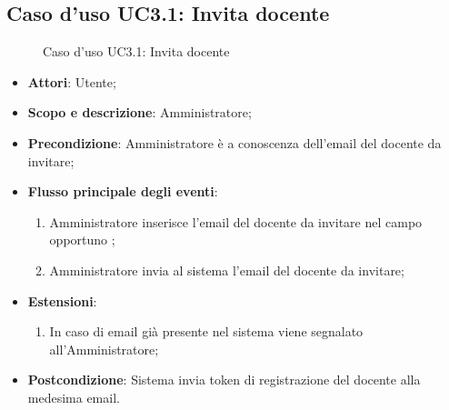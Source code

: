 \documentclass[12pt,a4paper]{article}
\begin{document}
\subsection{Caso d'uso UC3.1: Invita docente}
\begin{figure}[H]
	\centering

	\caption{Caso d'uso UC3.1: Invita docente}\label{fig:UC3.1} 
\end{figure}\begin{itemize}
\item \textbf{Attori}: Utente;
\item \textbf{Scopo e descrizione}: Amministratore; 
\item \textbf{Precondizione}: Amministratore è a conoscenza dell’email del docente da invitare;

\item \textbf{Flusso principale degli eventi}:
\begin{enumerate}
	\item Amministratore inserisce l'email del docente da invitare nel campo opportuno ;
	\item Amministratore invia al sistema l'email del docente da invitare;
	
\end{enumerate}
\item \textbf{Estensioni}:
\begin{enumerate}
	\item In caso di email già presente nel sistema viene segnalato all'Amministratore;
	
\end{enumerate}
\item \textbf{Postcondizione}: Sistema invia token di registrazione del docente alla medesima email.
\end{itemize}
\hypertarget{UC3.2}{}
\end{document}
